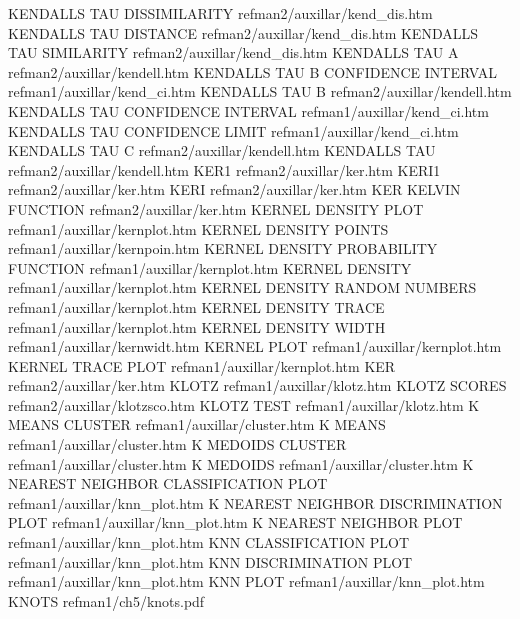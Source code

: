 KENDALLS TAU DISSIMILARITY              refman2/auxillar/kend_dis.htm
KENDALLS TAU DISTANCE                   refman2/auxillar/kend_dis.htm
KENDALLS TAU SIMILARITY                 refman2/auxillar/kend_dis.htm
KENDALLS TAU A                          refman2/auxillar/kendell.htm
KENDALLS TAU B CONFIDENCE INTERVAL      refman1/auxillar/kend_ci.htm
KENDALLS TAU B                          refman2/auxillar/kendell.htm
KENDALLS TAU CONFIDENCE INTERVAL        refman1/auxillar/kend_ci.htm
KENDALLS TAU CONFIDENCE LIMIT           refman1/auxillar/kend_ci.htm
KENDALLS TAU C                          refman2/auxillar/kendell.htm
KENDALLS TAU                            refman2/auxillar/kendell.htm
KER1                                    refman2/auxillar/ker.htm
KERI1                                   refman2/auxillar/ker.htm
KERI                                    refman2/auxillar/ker.htm
KER KELVIN FUNCTION                     refman2/auxillar/ker.htm
KERNEL DENSITY PLOT                     refman1/auxillar/kernplot.htm
KERNEL DENSITY POINTS                   refman1/auxillar/kernpoin.htm
KERNEL DENSITY PROBABILITY FUNCTION     refman1/auxillar/kernplot.htm
KERNEL DENSITY                          refman1/auxillar/kernplot.htm
KERNEL DENSITY RANDOM NUMBERS           refman1/auxillar/kernplot.htm
KERNEL DENSITY TRACE                    refman1/auxillar/kernplot.htm
KERNEL DENSITY WIDTH                    refman1/auxillar/kernwidt.htm
KERNEL PLOT                             refman1/auxillar/kernplot.htm
KERNEL TRACE PLOT                       refman1/auxillar/kernplot.htm
KER                                     refman2/auxillar/ker.htm
KLOTZ                                   refman1/auxillar/klotz.htm
KLOTZ SCORES                            refman2/auxillar/klotzsco.htm
KLOTZ TEST                              refman1/auxillar/klotz.htm
K MEANS CLUSTER                         refman1/auxillar/cluster.htm
K MEANS                                 refman1/auxillar/cluster.htm
K MEDOIDS CLUSTER                       refman1/auxillar/cluster.htm
K MEDOIDS                               refman1/auxillar/cluster.htm
K NEAREST NEIGHBOR CLASSIFICATION PLOT  refman1/auxillar/knn_plot.htm
K NEAREST NEIGHBOR DISCRIMINATION PLOT  refman1/auxillar/knn_plot.htm
K NEAREST NEIGHBOR PLOT                 refman1/auxillar/knn_plot.htm
KNN CLASSIFICATION PLOT                 refman1/auxillar/knn_plot.htm
KNN DISCRIMINATION PLOT                 refman1/auxillar/knn_plot.htm
KNN PLOT                                refman1/auxillar/knn_plot.htm
KNOTS                                   refman1/ch5/knots.pdf
